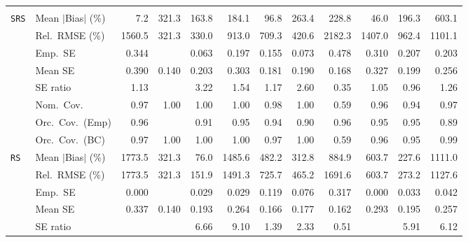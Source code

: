 \begin{landscape}
\begin{longtable}{llrrrrrrrrrr}
\addlinespace[2pt]
\multicolumn{12}{l}{\textbf{Binary \& Categorical Phase-One Covariates}} \\
\addlinespace[2pt]
\quad \texttt{SRS} & Mean $|$Bias$|$ (\%) & \cellcolor{rankone}7.2 & 321.3 & 163.8 & 184.1 & \cellcolor{rankthree}96.8 & 263.4 & 228.8 & \cellcolor{ranktwo}46.0 & 196.3 & 603.1 \\
 & Rel.\ RMSE (\%) & 1560.5 & \cellcolor{rankone}321.3 & \cellcolor{ranktwo}330.0 & 913.0 & 709.3 & \cellcolor{rankthree}420.6 & 2182.3 & 1407.0 & 962.4 & 1101.1 \\
 & Emp.\ SE & 0.344 &  & 0.063 & 0.197 & 0.155 & 0.073 & 0.478 & 0.310 & 0.207 & 0.203 \\
 & Mean SE & 0.390 & 0.140 & 0.203 & 0.303 & 0.181 & 0.190 & 0.168 & 0.327 & 0.199 & 0.256 \\
 & SE ratio & \cellcolor{rankthree}1.13 &  & 3.22 & 1.54 & 1.17 & 2.60 & 0.35 & \cellcolor{ranktwo}1.05 & \cellcolor{rankone}0.96 & 1.26 \\
 & Nom.\ Cov. & \cellcolor{ranktwo}0.97 & 1.00 & 1.00 & 1.00 & \cellcolor{rankthree}0.98 & 1.00 & 0.59 & \cellcolor{rankone}0.96 & \cellcolor{rankone}0.94 & \cellcolor{ranktwo}0.97 \\
 & Orc.\ Cov.\ (Emp) & \cellcolor{ranktwo}0.96 &  & \cellcolor{rankthree}0.91 & \cellcolor{rankone}0.95 & \cellcolor{ranktwo}0.94 & 0.90 & \cellcolor{ranktwo}0.96 & \cellcolor{rankone}0.95 & \cellcolor{rankone}0.95 & 0.89 \\
 & Orc.\ Cov.\ (BC) & \cellcolor{rankthree}0.97 & 1.00 & 1.00 & 1.00 & \cellcolor{rankthree}0.97 & 1.00 & 0.59 & \cellcolor{ranktwo}0.96 & \cellcolor{rankone}0.95 & 0.99 \\
\addlinespace[2pt]
\quad \texttt{RS} & Mean $|$Bias$|$ (\%) & 1773.5 & 321.3 & \cellcolor{rankone}76.0 & 1485.6 & 482.2 & \cellcolor{rankthree}312.8 & 884.9 & 603.7 & \cellcolor{ranktwo}227.6 & 1111.0 \\
 & Rel.\ RMSE (\%) & 1773.5 & \cellcolor{rankthree}321.3 & \cellcolor{rankone}151.9 & 1491.3 & 725.7 & 465.2 & 1691.6 & 603.7 & \cellcolor{ranktwo}273.2 & 1127.6 \\
 & Emp.\ SE & 0.000 &  & 0.029 & 0.029 & 0.119 & 0.076 & 0.317 & 0.000 & 0.033 & 0.042 \\
 & Mean SE & 0.337 & 0.140 & 0.193 & 0.264 & 0.166 & 0.177 & 0.162 & 0.293 & 0.195 & 0.257 \\
 & SE ratio &  &  & 6.66 & 9.10 & \cellcolor{rankone}1.39 & \cellcolor{rankthree}2.33 & \cellcolor{ranktwo}0.51 &  & 5.91 & 6.12 \\

\end{longtable}
\end{landscape}

